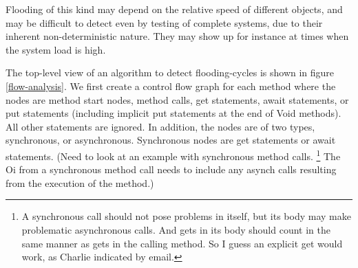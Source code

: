\documentclass[12pt]{article}%
\begin{document}
Flooding of this kind may depend on the relative
speed of different objects, and  may be difficult to detect even
by testing of complete systems, due to their inherent
non-deterministic nature.  They may show up for instance at times when
the system load is high.



The top-level view of an algorithm to detect flooding-cycles is shown in figure \ref{flow-analysis}.
We first create a control flow graph for each method where the nodes are method start nodes, method calls, get statements, 
await statements,
or put statements (including implicit put statements at the end of Void methods).
All other statements are ignored. 
In addition, the nodes are of two types,
synchronous, or asynchronous. Synchronous nodes are get statements or await statements.
(Need to look at an example with synchronous method calls.
\footnote{
A synchronous call should not pose problems in itself, but its body may make 
problematic asynchronous calls. And gets in its body should count in the same manner as gets in the calling method. So I guess an explicit get would work, as Charlie indicated by email.}
The Oi from a synchronous method call needs to include any asynch calls
resulting from the execution of the method.)
\end{document}
